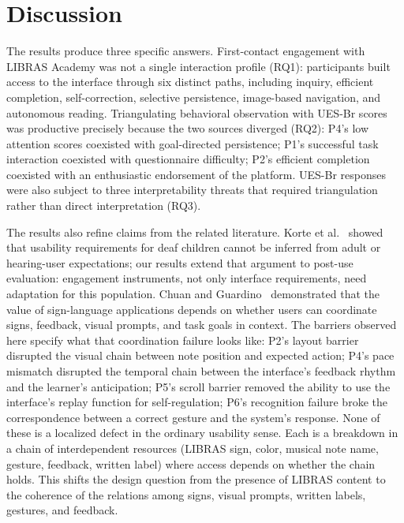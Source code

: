\documentclass{llncs}
\begin{document}
\section{Discussion}

The results produce three specific answers. First-contact engagement with LIBRAS Academy was not a single interaction profile (RQ1): participants built access to the interface through six distinct paths, including inquiry, efficient completion, self-correction, selective persistence, image-based navigation, and autonomous reading. Triangulating behavioral observation with UES-Br scores was productive precisely because the two sources diverged (RQ2): P4's low attention scores coexisted with goal-directed persistence; P1's successful task interaction coexisted with questionnaire difficulty; P2's efficient completion coexisted with an enthusiastic endorsement of the platform. UES-Br responses were also subject to three interpretability threats that required triangulation rather than direct interpretation (RQ3).

The results also refine claims from the related literature. Korte
et al.~\cite{korte2014requirements} showed that usability requirements for deaf children
cannot be inferred from adult or hearing-user expectations; our results extend that
argument to post-use evaluation: engagement instruments, not only interface
requirements, need adaptation for this population. Chuan and
Guardino~\cite{chuan2016smartsignplay} demonstrated that the value of sign-language
applications depends on whether users can coordinate signs, feedback, visual prompts,
and task goals in context. The barriers observed here specify what that coordination
failure looks like: P2's layout barrier disrupted the visual chain between note position
and expected action; P4's pace mismatch disrupted the temporal chain between the
interface's feedback rhythm and the learner's anticipation; P5's scroll barrier removed
the ability to use the interface's replay function for self-regulation; P6's recognition
failure broke the correspondence between a correct gesture and the system's response.
None of these is a localized defect in the ordinary usability sense. Each is a breakdown in a chain of interdependent resources (LIBRAS sign, color, musical note name, gesture, feedback, written label) where access depends on whether the chain holds.
This shifts the design question from the presence of LIBRAS content to the coherence of
the relations among signs, visual prompts, written labels, gestures, and feedback.
\end{document}
